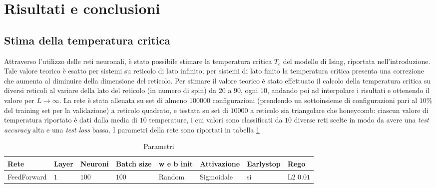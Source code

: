 \documentclass{article}
\begin{document}

\section{Risultati e conclusioni}

\subsection{Stima della temperatura critica}
Attraverso l'utilizzo delle reti neuronali, è stato possibile stimare la temperatura critica $T_c$ del modello di Ising, riportata nell'introduzione. Tale valore teorico è esatto per sistemi su reticolo di lato infinito; per sistemi di lato finito la temperatura critica presenta una correzione che aumenta al diminuire della dimensione del reticolo. Per stimare il valore teorico è stato effettuato il calcolo della temperatura critica su diversi reticoli al variare della lato del reticolo (in numero di spin) da $20$ a $90$, ogni $10$, andando poi ad interpolare i risultati e ottenendo il valore per $L\rightarrow \infty$.
La rete è stata allenata su set di almeno $100000$ configurazioni (prendendo un sottoinsieme di configurazioni pari al $10\%$ del training set per la validazione) a reticolo quadrato, e testata su set di $10000$ a reticolo sia triangolare che honeycomb: ciascun valore di temperatura riportato è dati dalla media di $10$ temperature, i cui valori sono classificati da $10$ diverse reti scelte in modo da avere una \emph{test accuracy} alta e una \emph{test loss} bassa. I parametri della rete sono riportati in tabella \ref{tab:ffnnpar}
\begin{table}[h]
\begin{center}
\begin{tabular}{llllllll}
\toprule
Rete & Layer & Neuroni & Batch size & w e b init & Attivazione & Earlystop & Rego\\
\midrule
FeedForward & $1$ & $100$ & $100$ & Random & Sigmoidale & si & L$2$ $0.01$\\
\bottomrule
\end{tabular}
\end{center}
\caption{Parametri}
\label{tab:ffnnpar}
\end{table}
\end{document}

